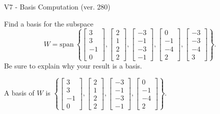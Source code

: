 \begin{exercise}
  \begin{exerciseTitle}V7 - Basis Computation (ver. 280)\end{exerciseTitle}
  \begin{exerciseStatement}
    Find a basis for the subspace 
\[W=\mathrm{span}\ \left\{\left[\begin{array}{r}
3 \\
3 \\
-1 \\
0
\end{array}\right] , \left[\begin{array}{r}
2 \\
1 \\
2 \\
2
\end{array}\right] , \left[\begin{array}{r}
-3 \\
-1 \\
-3 \\
-1
\end{array}\right] , \left[\begin{array}{r}
0 \\
-1 \\
-4 \\
2
\end{array}\right] , \left[\begin{array}{r}
-3 \\
-3 \\
-4 \\
3
\end{array}\right]\right\}.\]
 Be sure to explain why your result is a basis.


  \end{exerciseStatement}
  \begin{exerciseAnswer}
   A basis of \(W\) is  \(\left\{\left[\begin{array}{r}
3 \\
3 \\
-1 \\
0
\end{array}\right] , \left[\begin{array}{r}
2 \\
1 \\
2 \\
2
\end{array}\right] , \left[\begin{array}{r}
-3 \\
-1 \\
-3 \\
-1
\end{array}\right] , \left[\begin{array}{r}
0 \\
-1 \\
-4 \\
2
\end{array}\right]\right\}\).
  


  \end{exerciseAnswer}
\end{exercise}